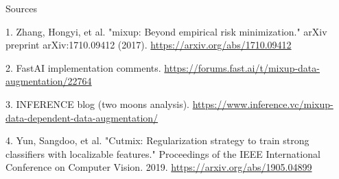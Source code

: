 \documentclass{beamer}
\begin{document}
\begin{frame}{Sources}
\begin{thebibliography}{0}

   1. Zhang, Hongyi, et al. "mixup: Beyond empirical risk minimization." arXiv preprint arXiv:1710.09412 (2017). \url{https://arxiv.org/abs/1710.09412}
  
   2. FastAI implementation comments. \url{https://forums.fast.ai/t/mixup-data-augmentation/22764}
  
   3. INFERENCE blog (two moons analysis). \url{https://www.inference.vc/mixup-data-dependent-data-augmentation/} 
  
   4. Yun, Sangdoo, et al. "Cutmix: Regularization strategy to train strong classifiers with localizable features." Proceedings of the IEEE International Conference on Computer Vision. 2019. \url{https://arxiv.org/abs/1905.04899}
  
\end{thebibliography}

\end{frame}

 
\end{document}
